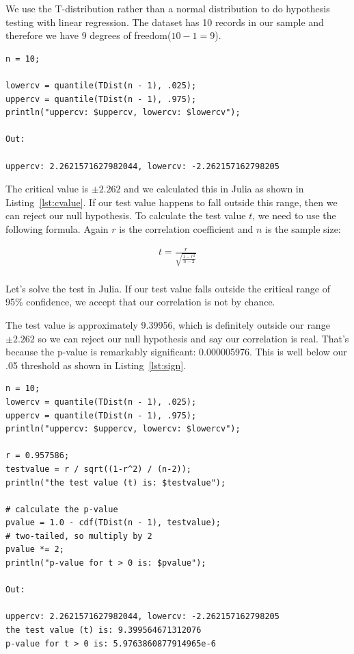\documentclass[a4paper, 11pt]{article}
\begin{document}
We use the T-distribution rather than a normal distribution to do hypothesis testing with linear regression. The dataset has 10 records in our sample and therefore we have 9 degrees of freedom($10 - 1 = 9$).

\begin{lstlisting}[label={lst:cvalue},caption={Calculating the critical value from a T-distribution}]
n = 10;

lowercv = quantile(TDist(n - 1), .025);
uppercv = quantile(TDist(n - 1), .975);
println("uppercv: $uppercv, lowercv: $lowercv");

Out:

uppercv: 2.2621571627982044, lowercv: -2.262157162798205

\end{lstlisting}

The critical value is $\pm2.262$ and we calculated this in Julia as shown in Listing~\ref{lst:cvalue}. If our test value happens to fall outside this range, then we can reject our null hypothesis. To calculate the test value $t$, we need to use the following formula. Again $r$ is the correlation coefficient and $n$ is the sample size:

\begin{equation}
\begin{aligned}
t = \frac{r}{\sqrt{\frac{1-r^2}{n - 2}}} \\[5pt]
\end{aligned}
\end{equation}

Let's solve the test in Julia. If our test value falls outside the critical range of 95\% confidence, we accept that our correlation is not by chance.

The test value is approximately 9.39956, which is definitely outside our range $\pm2.262$ so we can reject our null hypothesis and say our correlation is real. That's because the p-value is remarkably significant: 0.000005976. This is well below our .05 threshold as shown in Listing~\ref{lst:sign}.

\begin{lstlisting}[label={lst:sign},caption={Testing significance for linear-looking data}]
n = 10;
lowercv = quantile(TDist(n - 1), .025);
uppercv = quantile(TDist(n - 1), .975);
println("uppercv: $uppercv, lowercv: $lowercv");

r = 0.957586;
testvalue = r / sqrt((1-r^2) / (n-2));
println("the test value (t) is: $testvalue");

# calculate the p-value
pvalue = 1.0 - cdf(TDist(n - 1), testvalue);
# two-tailed, so multiply by 2
pvalue *= 2;
println("p-value for t > 0 is: $pvalue");

Out:

uppercv: 2.2621571627982044, lowercv: -2.262157162798205
the test value (t) is: 9.399564671312076
p-value for t > 0 is: 5.9763860877914965e-6
\end{lstlisting}
\end{document}
